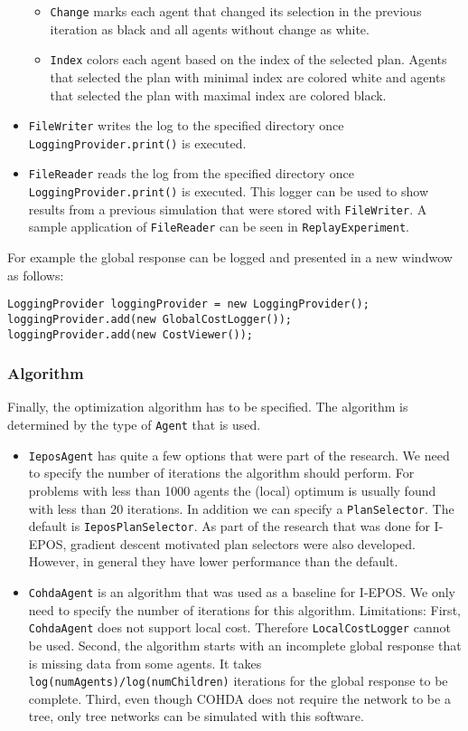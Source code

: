 \documentclass[11pt]{article} %
\newcommand{\code}{\texttt}
\begin{document}
\begin{itemize}
	\begin{itemize}
		\item \code{Change} marks each agent that changed its selection in the previous iteration as black and all agents without change as white.
		\item \code{Index} colors each agent based on the index of the selected plan. Agents that selected the plan with minimal index are colored white and agents that selected the plan with maximal index are colored black.
	\end{itemize}
	\item \code{FileWriter} writes the log to the specified directory once \code{LoggingProvider.print()} is executed.
	\item \code{FileReader} reads the log from the specified directory once \code{LoggingProvider.print()} is executed. This logger can be used to show results from a previous simulation that were stored with \code{FileWriter}. A sample application of \code{FileReader} can be seen in \code{ReplayExperiment}.
\end{itemize}

\noindent For example the global response can be logged and presented in a new windwow as follows:
\begin{verbatim}
LoggingProvider loggingProvider = new LoggingProvider();
loggingProvider.add(new GlobalCostLogger());
loggingProvider.add(new CostViewer());
\end{verbatim}

\subsubsection*{Algorithm}
Finally, the optimization algorithm has to be specified. The algorithm is determined by the type of \code{Agent} that is used.
\begin{itemize}
	\item \code{IeposAgent} has quite a few options that were part of the research. We need to specify the number of iterations the algorithm should perform. For problems with less than 1000 agents the (local) optimum is usually found with less than 20 iterations. In addition we can specify a \code{PlanSelector}. The default is \code{IeposPlanSelector}. As part of the research that was done for I-EPOS, gradient descent motivated plan selectors were also developed. However, in general they have lower performance than the default.
	\item \code{CohdaAgent} is an algorithm that was used as a baseline for I-EPOS. We only need to specify the number of iterations for this algorithm. Limitations: First, \code{CohdaAgent} does not support local cost. Therefore \code{LocalCostLogger} cannot be used. Second, the algorithm starts with an incomplete global response that is missing data from some agents. It takes \code{log(numAgents)/log(numChildren)} iterations for the global response to be complete. Third, even though COHDA does not require the network to be a tree, only tree networks can be simulated with this software.
\end{itemize}
\end{document}
